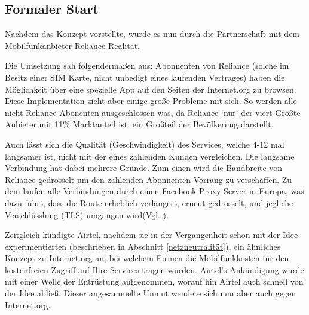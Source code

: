 \documentclass{article}
\begin{document}
\subsection{Formaler Start}

Nachdem \textcite{HumanRight} das Konzept vorstellte, wurde es nun durch die Partnerschaft mit dem Mobilfunkanbieter Reliance Realität.

Die Umsetzung sah folgendermaßen aus: Abonnenten von Reliance (solche im Besitz einer SIM Karte, nicht unbedigt eines laufenden Vertrages) haben die Möglichkeit über eine spezielle App auf den Seiten der Internet.org zu browsen.
Diese Implementation zieht aber einige große Probleme mit sich. So werden alle nicht-Reliance Abonenten ausgeschlossen was, da Reliance `nur' der viert Größte Anbieter mit 11\% Marktanteil\autocite{mobileSubscribers} ist, ein Großteil der Bevölkerung darstellt.

Auch lässt sich die Qualität (Geschwindigkeit) des Services, welche 4-12 mal langsamer ist, nicht mit der eines zahlenden Kunden vergleichen.
Die langsame Verbindung hat dabei mehrere Gründe. Zum einen wird die Bandbreite von Reliance gedrosselt um den zahlenden Abonnenten Vorrang zu verschaffen. Zu dem laufen alle Verbindungen durch einen Facebook Proxy Server in Europa, was dazu führt, dass die Route erheblich verlängert, erneut gedrosselt, und jegliche Verschlüsslung (TLS) umgangen wird(Vgl. \cite{walledGarden}).

\medskip

Zeitgleich kündigte Airtel, nachdem sie in der Vergangenheit schon mit der Idee experimentierten (beschrieben in Abschnitt \ref{netzneutralität}), ein ähnliches Konzept zu Internet.org an, bei welchem Firmen die Mobilfunkkosten für den kostenfreien Zugriff auf Ihre Services tragen würden.
Airtel's Ankündigung wurde mit einer Welle der Entrüstung aufgenommen, worauf hin Airtel auch schnell von der Idee abließ.
Dieser angesammelte Unmut wendete sich nun aber auch gegen Internet.org.

\end{document}

